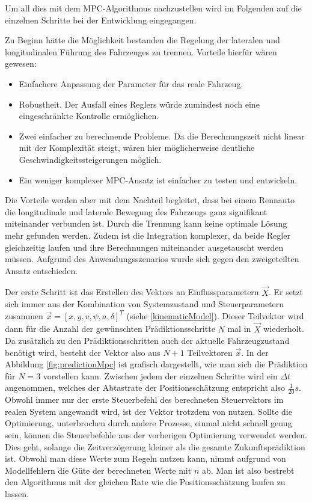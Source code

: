 \documentclass{like}
\begin{document}
Um all dies mit dem \ac{MPC}-Algorithmus nachzustellen wird im Folgenden auf die einzelnen Schritte bei der Entwicklung eingegangen.

Zu Beginn hätte die Möglichkeit bestanden die Regelung der lateralen und longitudinalen Führung des Fahrzeuges zu trennen. 
Vorteile hierfür wären gewesen:
\begin{itemize}
	\item Einfachere Anpassung der Parameter für das reale Fahrzeug.
	\item Robustheit. Der Ausfall eines Reglers würde zumindest noch eine eingeschränkte Kontrolle ermöglichen.
	\item Zwei einfacher zu berechnende Probleme. Da die Berechnungszeit nicht linear mit der Komplexität steigt, wären hier möglicherweise deutliche Geschwindigkeitssteigerungen möglich.
	\item Ein weniger komplexer \ac{MPC}-Ansatz ist einfacher zu testen und entwickeln.
\end{itemize}

Die Vorteile werden aber mit dem Nachteil begleitet, dass bei einem Rennauto die longitudinale und laterale Bewegung des Fahrzeugs ganz signifikant miteinander verbunden ist. Durch die Trennung kann keine optimale Lösung mehr gefunden werden. 
Zudem ist die Integration komplexer, da beide Regler gleichzeitig laufen und ihre Berechnungen miteinander ausgetauscht werden müssen.
Aufgrund des Anwendungsszenarios wurde sich gegen den zweigeteilten Ansatz entschieden.


Der erste Schritt ist das Erstellen des Vektors an Einflussparametern $\vec{X}$. Er setzt sich immer aus der Kombination von Systemzustand und Steuerparametern zusammen  $\vec{x} = [x, y, v, \psi, a, \delta ]^T $ (siehe \ref{kinematicModel}). 
Dieser Teilvektor wird dann für die Anzahl der gewünschten Prädiktionsschritte \(N\) mal in $\vec{X}$ wiederholt. Da zusätzlich zu den Prädiktionsschritten auch der aktuelle Fahrzeugzustand benötigt wird, besteht der Vektor also aus $N+1$ Teilvektoren $\vec{x}$. In der Abbildung \ref{fig:predictionMpc} ist grafisch dargestellt, wie man sich die Prädiktion für $N=3$ vorstellen kann. Zwischen jedem der einzelnen Schritte wird ein $\Delta t$ angenommen, welches der Abtastrate der Positionsschätzung entspricht also $\frac{1}{20} s$. Obwohl immer nur der erste Steuerbefehl des berechneten Steuervektors im realen System angewandt wird, ist der Vektor trotzdem von nutzen. Sollte die Optimierung, unterbrochen durch andere Prozesse, einmal nicht schnell genug sein, können die Steuerbefehle aus der vorherigen Optimierung verwendet werden. Dies geht, solange die Zeitverzögerung kleiner als die gesamte Zukunftsprädiktion ist. Obwohl man diese Werte zum Regeln nutzen kann, nimmt aufgrund von Modellfehlern die Güte der berechneten Werte mit \(n\) ab. Man ist also bestrebt den Algorithmus mit der gleichen Rate wie die Positionsschätzung laufen zu lassen. 
\end{document}
